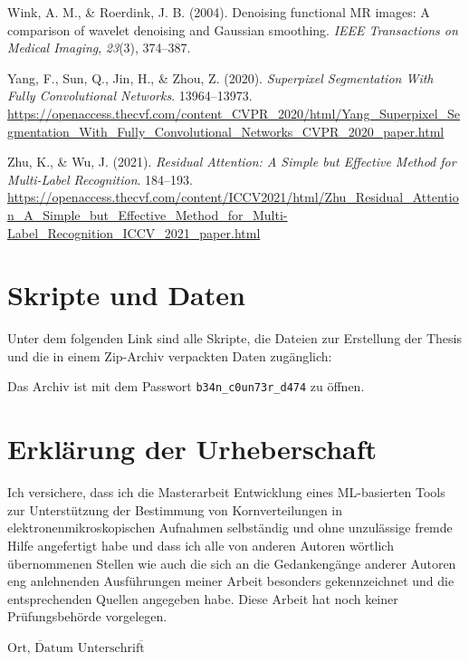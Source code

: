\documentclass[
  12pt,
  openany]{book}
\newlength{\cslhangindent}
\newlength{\cslentryspacingunit} %
\newenvironment{CSLReferences}[2] %
 {%
  \setlength{\parindent}{0pt}
  \ifodd #1
  \let\oldpar\par
  \def\par{\hangindent=\cslhangindent\oldpar}
  \fi
  \setlength{\parskip}{#2\cslentryspacingunit}
 }%
 {}
\begin{document}
\begin{CSLReferences}{1}{0}
\leavevmode{}%
Wink, A. M., \& Roerdink, J. B. (2004). Denoising functional {MR} images: A comparison of wavelet denoising and {Gaussian} smoothing. \emph{IEEE Transactions on Medical Imaging}, \emph{23}(3), 374--387.

\leavevmode{}%
Yang, F., Sun, Q., Jin, H., \& Zhou, Z. (2020). \emph{Superpixel {Segmentation With Fully Convolutional Networks}}. 13964--13973. \url{https://openaccess.thecvf.com/content_CVPR_2020/html/Yang_Superpixel_Segmentation_With_Fully_Convolutional_Networks_CVPR_2020_paper.html}

\leavevmode{}%
Zhu, K., \& Wu, J. (2021). \emph{Residual {Attention}: {A Simple} but {Effective Method} for {Multi-Label Recognition}}. 184--193. \url{https://openaccess.thecvf.com/content/ICCV2021/html/Zhu_Residual_Attention_A_Simple_but_Effective_Method_for_Multi-Label_Recognition_ICCV_2021_paper.html}

\end{CSLReferences}

\chapter*{Skripte und Daten}

Unter dem folgenden Link sind alle Skripte, die Dateien zur Erstellung der Thesis und die in einem Zip-Archiv verpackten Daten zugänglich:



Das Archiv ist mit dem Passwort \texttt{b34n_c0un73r_d474} zu öffnen.



\chapter*{Erklärung der Urheberschaft}

Ich versichere, dass ich die Masterarbeit \glqq{}Entwicklung eines ML-basierten Tools zur Unterstützung der Bestimmung von Kornverteilungen in elektronenmikroskopischen Aufnahmen\grqq{} selbständig und ohne
unzulässige fremde Hilfe angefertigt habe und dass ich alle von anderen Autoren wörtlich
übernommenen Stellen wie auch die sich an die Gedankengänge anderer Autoren eng
anlehnenden Ausführungen meiner Arbeit besonders gekennzeichnet und die
entsprechenden Quellen angegeben habe.
Diese Arbeit hat noch keiner Prüfungsbehörde vorgelegen.

\vspace{4cm}

\hspace{2cm} $\overline{\text{Ort, Datum}}$ \hfill $\overline{\text{Unterschrift} \hspace{2cm}}$
\end{document}
